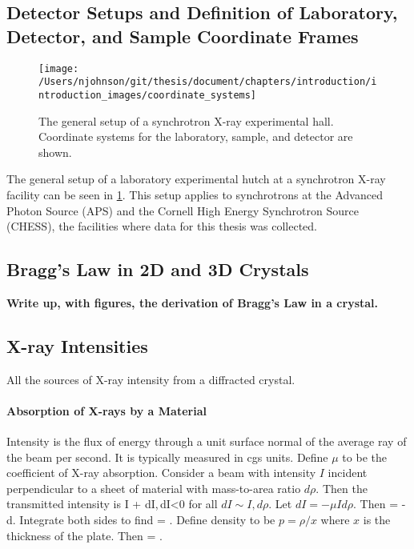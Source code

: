 \subsection{Detector Setups and Definition of Laboratory, Detector, and Sample Coordinate Frames}\label{detector_setup}
\begin{figure}
	\texttt{[image: /Users/njohnson/git/thesis/document/chapters/introduction/introduction\_images/coordinate\_systems]}
	\caption{The general setup of a synchrotron X-ray experimental hall. Coordinate systems for the laboratory, sample, and detector are shown.}
	\label{coordinate_systems}
\end{figure}
The general setup of a laboratory experimental hutch at a synchrotron X-ray facility can be seen in \ref{coordinate_systems}. This setup applies to synchrotrons at the Advanced Photon Source (APS) and the Cornell High Energy Synchrotron Source (CHESS), the facilities where data for this thesis was collected.


\subsection{Bragg's Law in 2D and 3D Crystals}
\textbf{Write up, with figures, the derivation of Bragg's Law in a crystal.}


\subsection{X-ray Intensities}
All the sources of X-ray intensity from a diffracted crystal.

\paragraph{Absorption of X-rays by a Material}
Intensity is the flux of energy through a unit surface normal of the average ray of the beam per second. It is typically measured in cgs units. Define $\mu$ to be the coefficient of X-ray absorption. Consider a beam with intensity $I$ incident perpendicular to a sheet of material with mass-to-area ratio $d\rho$. Then the transmitted intensity is 
\eqn
	I + dI,\,dI<0
\equ
for all $dI\sim I,d\rho$. Let $dI = -\mu I d\rho$. Then
\eqn
{} = -\mu d\rho.
\equ
Integrate both sides to find
\eqn
	 = \exp{[-\mu\rho]}.
\equ
Define density to be $p = \rho/x$ where $x$ is the thickness of the plate. Then
\eqn
	 = \exp{[-\mu px]}.
	\label{intensity}
\equ

